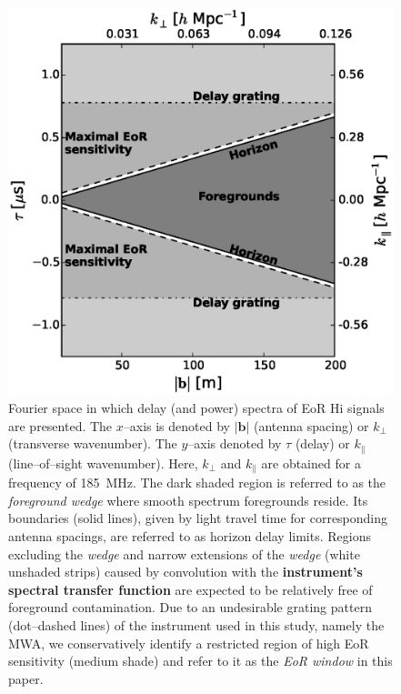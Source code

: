 \documentclass[preprint2,iop,numberedappendix]{emulateapj}
\begin{document}
\begin{figure}[htb]
\centering
\includegraphics[width=\linewidth]{fig2.eps}
\caption{Fourier space in which delay (and power) spectra of EoR H{\sc i} signals are presented. The $x$--axis is denoted by $|\boldsymbol{b}|$ (antenna spacing) or $k_\perp$ (transverse wavenumber). The $y$--axis denoted by $\tau$ (delay) or $k_\parallel$ (line--of--sight wavenumber). Here, $k_\perp$ and $k_\parallel$ are obtained for a frequency of 185~MHz. The dark shaded region is referred to as the {\it foreground wedge} where smooth spectrum foregrounds reside. Its boundaries (solid lines), given by light travel time for corresponding antenna spacings, are referred to as horizon delay limits. Regions excluding the {\it wedge} and narrow extensions of the {\it wedge} (white unshaded strips) caused by convolution with the {\bf instrument's spectral transfer function} are expected to be relatively free of foreground contamination. Due to an undesirable grating pattern (dot--dashed lines) of the instrument used in this study, namely the MWA, we conservatively identify a restricted region of high EoR sensitivity (medium shade) and refer to it as the {\it EoR window} in this paper. \label{fig:fourier-space}}
\end{figure}
\end{document}
